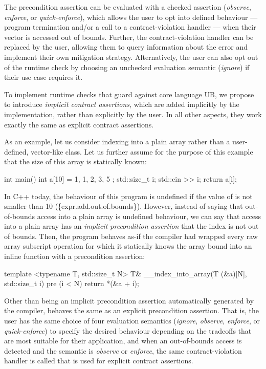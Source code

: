 The precondition assertion  can be evaluated with a checked assertion  (\emph{observe}, \emph{enforce}, or \emph{quick-enforce}), which allows the user to opt into defined behaviour --- program termination and/or a call to a contract-violation handler --- when their vector is accessed out of bounds. Further, the contract-violation handler can be replaced by the user, allowing them to query information about the error and implement their own mitigation strategy. Alternatively, the user can also opt out of the runtime check by choosing an unchecked evaluation semantic (\emph{ignore}) if their use case requires it.

To implement runtime checks that guard against core language UB, we propose to introduce \emph{implicit contract assertions}, which are added implicitly by the implementation, rather than explicitly by the user. In all other aspects, they work exactly the same as explicit contract assertions.

As an example, let us consider indexing into a plain array rather than a user-defined, vector-like class. Let us further assume for the purpose of this example that the size  of this array is statically known:

\begin{codeblock}
int main() {
  int a[10] = { 1, 1, 2, 3, 5 };
  std::size_t i; 
  std::cin >> i;
  return a[i];
}
\end{codeblock}

In C++ today, the behaviour of this program is undefined if the value of  is not smaller than 10 (\{expr.add.out.of.bounds\}). However, instead of saying that out-of-bounds access into a plain array is undefined behaviour, we can say that access into a plain array has an \emph{implicit precondition assertion} that the index is not out of bounds. Then, the program behaves as-if the compiler had wrapped every raw array subscript operation for which it statically knows the array bound  into an inline function with a precondition assertion:

\begin{codeblock}
template <typename T, std::size_t N>
T& __index_into_array(T (&a)[N], std::size_t i) 
pre (i < N) {
  return *(&a + i);
}
\end{codeblock}

Other than being an implicit precondition assertion automatically generated by the compiler,  behaves the same as an explicit precondition assertion. That is, the user has the same choice of four evaluation semantics (\emph{ignore}, \emph{observe}, \emph{enforce}, or \emph{quick-enforce}) to specify the desired behaviour depending on the tradeoffs that are most suitable for their application, and when an out-of-bounds access is detected and the semantic is \emph{observe} or \emph{enforce}, the same contract-violation handler is called that is used for explicit contract assertions.

